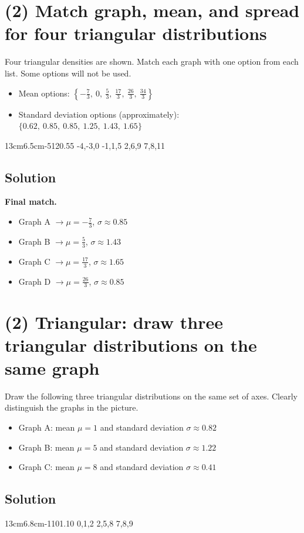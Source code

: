 \section{(2) Match graph, mean, and spread for four triangular distributions}
Four triangular densities are shown.
Match each graph with one option from each list. Some options will not be used.
\begin{itemize}
\item Mean options: $\left\{-\frac{7}{3},\ 0,\ \frac{5}{3},\ \frac{17}{3},\ \frac{26}{3},\ \frac{34}{3} \right\}$
\item Standard deviation options (approximately): $\{0.62,\ 0.85,\ 0.85,\ 1.25,\ 1.43,\ 1.65\}$
\end{itemize}
\TriangularFourGraph
{13cm}{6.5cm}{-5}{12}{0.55}
{-4,-3,0}
{-1,1,5}
{2,6,9}
{7,8,11}

\subsection*{Solution}
\textbf{Final match.}
\begin{itemize}
\item Graph A $\to \mu=-\frac{7}{3}$, $\sigma\approx0.85$
\item Graph B $\to \mu=\frac{5}{3}$, $\sigma\approx1.43$
\item Graph C $\to \mu=\frac{17}{3}$, $\sigma\approx1.65$
\item Graph D $\to \mu=\frac{26}{3}$, $\sigma\approx0.85$
\end{itemize}

\section{(2) Triangular: draw three triangular distributions on the same graph}
Draw the following three triangular distributions on the same set of axes. Clearly distinguish the graphs in the picture.
\begin{itemize}
\item Graph A: mean $\mu=1$ and standard deviation $\sigma\approx0.82$
\item Graph B: mean $\mu=5$ and standard deviation $\sigma\approx1.22$
\item Graph C: mean $\mu=8$ and standard deviation $\sigma\approx0.41$
\end{itemize}
\subsection*{Solution}
\TriangularThreeGraph
{13cm}{6.8cm}{-1}{10}{1.10}
{0,1,2}
{2,5,8}
{7,8,9}

